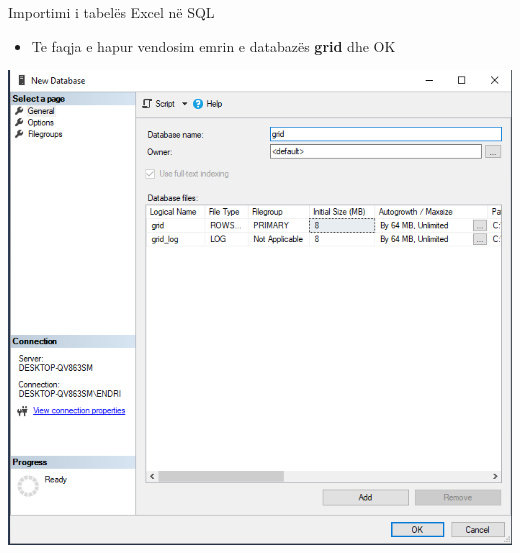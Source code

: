 \documentclass[
  ignorenonframetext,
]{beamer}
\providecommand{\tightlist}{%
  \setlength{\itemsep}{0pt}\setlength{\parskip}{0pt}}
\begin{document}
\begin{frame}{Importimi i tabelës Excel në SQL}
\label{importimi-i-tabeluxebs-excel-nuxeb-sql-2}
\begin{itemize}
\tightlist
\item
  Te faqja e hapur vendosim emrin e databazës \textbf{grid} dhe OK
\end{itemize}

\includegraphics{./Figs/db3.png}
\end{frame}
\end{document}
